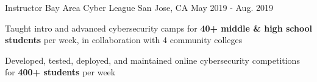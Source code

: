 \begin{cventries}
  \cventry
    {Instructor} %
    {Bay Area Cyber League} %
    {San Jose, CA} %
    {May 2019 - Aug. 2019} %
    {
      \begin{cvitems} %
        \item {Taught intro and advanced cybersecurity camps for \textbf{40+ middle \& high school students} per week, in collaboration with 4 community colleges}
        \item {Developed, tested, deployed, and maintained online cybersecurity competitions for \textbf{400+ students} per week}
      \end{cvitems}
    }


\end{cventries}
